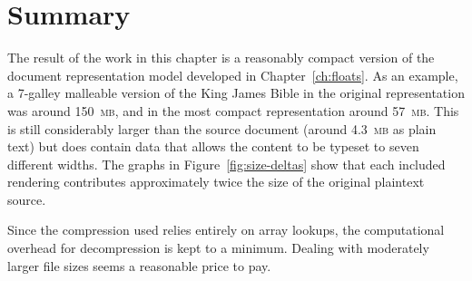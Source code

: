 \section{Summary}

The result of the work in this chapter is a reasonably compact version of the document representation model developed in Chapter~\ref{ch:floats}. As an example, a 7-galley malleable version of the King James Bible in the original representation was around 150~\textsc{mb}, and in the most compact representation around 57~\textsc{mb}. This is still considerably larger than the source document (around 4.3~\textsc{mb} as plain text) but does contain data that allows the content to be typeset to seven different widths. The graphs in Figure~\ref{fig:size-deltas} show that each included rendering contributes approximately twice the size of the original plaintext source.

Since the compression used relies entirely on array lookups, the computational overhead for decompression is kept to a minimum. Dealing with moderately larger file sizes seems a reasonable price to pay.

